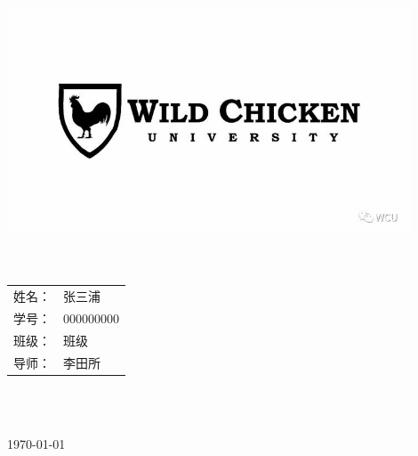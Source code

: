 \begin{titlepage}
	\newcommand{\ID}{{\Large 000000000}}
	\newcommand{\supervisor}{{\Large 李田所}}
	\newcommand{\class}{{\Large 班级}}
    
	\center
	\quad\\[1cm]
	\includegraphics[width=12cm]{Content/logo.jpg}\\[1.5cm]
	\quad\\[1cm]
	\makeatletter
	{\linespread{4}\Huge\bfseries\@title}\\[2cm]
	\begin{table}[H]
		\centering
		  \begin{tabular}{rl}
			{\Large 姓名：}&{\Large 张三浦}\\[0.5cm]
			{\Large 学号：}&\ID\\[0.5cm]
			{\Large 班级：}&\class\\[0.5cm]
			{\Large 导师：}&\supervisor
		  \end{tabular}\\
	\end{table}
	\makeatother
	\quad\\[1cm]
	{\Large \today}\\[2cm] %
	\vfill 
\end{titlepage}